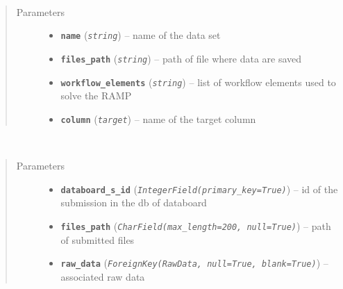\documentclass[letterpaper,10pt,english]{sphinxmanual}
\begin{document}
\begin{fulllineitems}
\label{modules/models:runapp.models.RawData}~\begin{quote}\begin{description}
\item[{Parameters}] \leavevmode\begin{itemize}
\item {} 
\textbf{\texttt{name}} (\emph{\texttt{string}}) -- name of the data set

\item {} 
\textbf{\texttt{files\_path}} (\emph{\texttt{string}}) -- path of file where data are saved

\item {} 
\textbf{\texttt{workflow\_elements}} (\emph{\texttt{string}}) -- list of workflow elements used to solve the RAMP

\item {} 
\textbf{\texttt{column}} (\emph{\texttt{target}}) -- name of the target column

\end{itemize}

\end{description}\end{quote}

\end{fulllineitems}


\begin{fulllineitems}
\label{modules/models:runapp.models.Submission}~\begin{quote}\begin{description}
\item[{Parameters}] \leavevmode\begin{itemize}
\item {} 
\textbf{\texttt{databoard\_s\_id}} (\emph{\texttt{IntegerField(primary\_key=True)}}) -- id of the submission in the db of databoard

\item {} 
\textbf{\texttt{files\_path}} (\emph{\texttt{CharField(max\_length=200, null=True)}}) -- path of submitted files

\item {} 
\textbf{\texttt{raw\_data}} (\emph{\texttt{ForeignKey(RawData, null=True, blank=True)}}) -- associated raw data

\end{itemize}

\end{description}\end{quote}

\end{fulllineitems}
\end{document}
